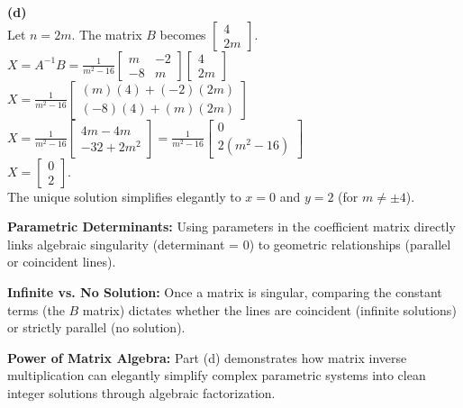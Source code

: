 \begin{solution}
\medskip
\textbf{(d)} \\
Let $n = 2m$. The matrix $B$ becomes $\begin{bmatrix} 4 \\ 2m \end{bmatrix}$. \\
$X = A^{-1}B = \frac{1}{m^2 - 16} \begin{bmatrix} m & -2 \\ -8 & m \end{bmatrix} \begin{bmatrix} 4 \\ 2m \end{bmatrix}$ \\
$X = \frac{1}{m^2 - 16} \begin{bmatrix} (m)(4) + (-2)(2m) \\ (-8)(4) + (m)(2m) \end{bmatrix}$ \\
$X = \frac{1}{m^2 - 16} \begin{bmatrix} 4m - 4m \\ -32 + 2m^2 \end{bmatrix} = \frac{1}{m^2 - 16} \begin{bmatrix} 0 \\ 2(m^2 - 16) \end{bmatrix}$ \\
$X = \begin{bmatrix} 0 \\ 2 \end{bmatrix}$. \\
The unique solution simplifies elegantly to $x = 0$ and $y = 2$ (for $m \neq \pm 4$).
\end{solution}

\begin{takeaways}
\item \textbf{Parametric Determinants:} Using parameters in the coefficient matrix directly links algebraic singularity (determinant = 0) to geometric relationships (parallel or coincident lines).
\item \textbf{Infinite vs. No Solution:} Once a matrix is singular, comparing the constant terms (the $B$ matrix) dictates whether the lines are coincident (infinite solutions) or strictly parallel (no solution).
\item \textbf{Power of Matrix Algebra:} Part (d) demonstrates how matrix inverse multiplication can elegantly simplify complex parametric systems into clean integer solutions through algebraic factorization.
\end{takeaways}


